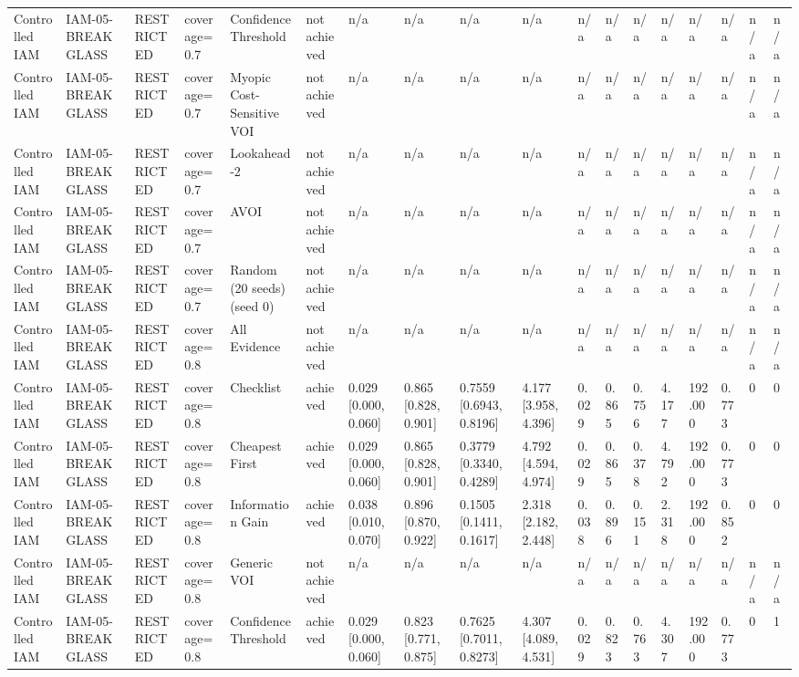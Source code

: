 \begin{table}[!ht]
{\begin{tabular}{llllllllllllllllll}
Controlled IAM & IAM-05-BREAKGLASS & RESTRICTED & coverage=0.7 & Confidence Threshold & not achieved & n/a & n/a & n/a & n/a & n/a & n/a & n/a & n/a & n/a & n/a & n/a & n/a \\
Controlled IAM & IAM-05-BREAKGLASS & RESTRICTED & coverage=0.7 & Myopic Cost-Sensitive VOI & not achieved & n/a & n/a & n/a & n/a & n/a & n/a & n/a & n/a & n/a & n/a & n/a & n/a \\
Controlled IAM & IAM-05-BREAKGLASS & RESTRICTED & coverage=0.7 & Lookahead-2 & not achieved & n/a & n/a & n/a & n/a & n/a & n/a & n/a & n/a & n/a & n/a & n/a & n/a \\
Controlled IAM & IAM-05-BREAKGLASS & RESTRICTED & coverage=0.7 & AVOI & not achieved & n/a & n/a & n/a & n/a & n/a & n/a & n/a & n/a & n/a & n/a & n/a & n/a \\
Controlled IAM & IAM-05-BREAKGLASS & RESTRICTED & coverage=0.7 & Random (20 seeds) (seed 0) & not achieved & n/a & n/a & n/a & n/a & n/a & n/a & n/a & n/a & n/a & n/a & n/a & n/a \\
Controlled IAM & IAM-05-BREAKGLASS & RESTRICTED & coverage=0.8 & All Evidence & not achieved & n/a & n/a & n/a & n/a & n/a & n/a & n/a & n/a & n/a & n/a & n/a & n/a \\
Controlled IAM & IAM-05-BREAKGLASS & RESTRICTED & coverage=0.8 & Checklist & achieved & 0.029 [0.000, 0.060] & 0.865 [0.828, 0.901] & 0.7559 [0.6943, 0.8196] & 4.177 [3.958, 4.396] & 0.029 & 0.865 & 0.756 & 4.177 & 192.000 & 0.773 & 0 & 0 \\
Controlled IAM & IAM-05-BREAKGLASS & RESTRICTED & coverage=0.8 & Cheapest First & achieved & 0.029 [0.000, 0.060] & 0.865 [0.828, 0.901] & 0.3779 [0.3340, 0.4289] & 4.792 [4.594, 4.974] & 0.029 & 0.865 & 0.378 & 4.792 & 192.000 & 0.773 & 0 & 0 \\
Controlled IAM & IAM-05-BREAKGLASS & RESTRICTED & coverage=0.8 & Information Gain & achieved & 0.038 [0.010, 0.070] & 0.896 [0.870, 0.922] & 0.1505 [0.1411, 0.1617] & 2.318 [2.182, 2.448] & 0.038 & 0.896 & 0.151 & 2.318 & 192.000 & 0.852 & 0 & 0 \\
Controlled IAM & IAM-05-BREAKGLASS & RESTRICTED & coverage=0.8 & Generic VOI & not achieved & n/a & n/a & n/a & n/a & n/a & n/a & n/a & n/a & n/a & n/a & n/a & n/a \\
Controlled IAM & IAM-05-BREAKGLASS & RESTRICTED & coverage=0.8 & Confidence Threshold & achieved & 0.029 [0.000, 0.060] & 0.823 [0.771, 0.875] & 0.7625 [0.7011, 0.8273] & 4.307 [4.089, 4.531] & 0.029 & 0.823 & 0.763 & 4.307 & 192.000 & 0.773 & 0 & 1 \\

\end{tabular}}
\end{table}
